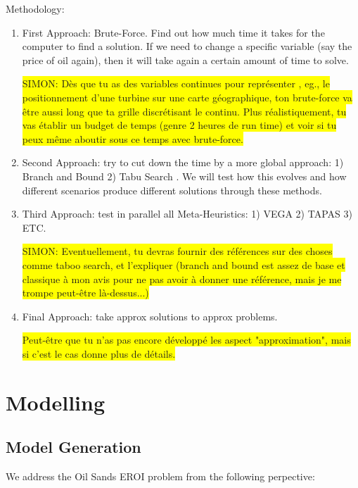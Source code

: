 \documentclass[12pt]{article}
\newcommand{\h}[1]{\colorbox{yellow}{#1}}
\begin{document}
Methodology:
\begin{enumerate}
\item First Approach: Brute-Force. Find out how much time it takes for the computer to find a solution. If we need to change a specific variable (say the price of oil again), then it will take again a certain amount of time to solve. 

\h{SIMON: Dès que tu as des variables continues pour représenter , eg., le positionnement d'une turbine sur une carte géographique, ton brute-force va être aussi long que ta grille discrétisant le continu. Plus réalistiquement, tu vas établir un budget de temps (genre 2 heures de run time) et voir si tu peux même aboutir sous ce temps avec brute-force.}

\item Second Approach: try to cut down the time by a more global approach: 1) Branch and Bound 2) Tabu Search . We will test how this evolves and how different scenarios produce different solutions through these methods. 
\item Third Approach: test in parallel all Meta-Heuristics: 1) VEGA 2) TAPAS 3) ETC. 

\h{SIMON: Eventuellement, tu devras fournir des références sur des choses comme taboo search, et l'expliquer (branch and bound est assez de base et classique à mon avis pour ne pas avoir à donner une référence, mais je me trompe peut-être là-dessus...)}

\item Final Approach: take approx solutions to approx problems. 

\h{Peut-être que tu n'as pas encore développé les aspect "approximation", mais si c'est le cas donne plus de détails.}

\end{enumerate}


\section{Modelling}

\subsection{Model Generation}

We address the Oil Sands EROI problem from the following perpective: \\
\end{document}

